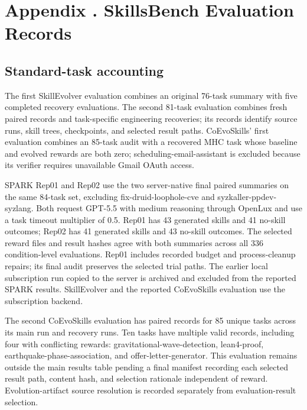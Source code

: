 \section{Appendix \thesection. SkillsBench Evaluation Records}
\label{app:skillsbench-records}
\setcounter{table}{0}
\renewcommand{\thetable}{\thesection\arabic{table}}

\subsection{Standard-task accounting}
The first SkillEvolver evaluation combines an original 76-task summary with five completed recovery evaluations. The second 81-task evaluation combines fresh paired records and task-specific engineering recoveries; its records identify source runs, skill trees, checkpoints, and selected result paths. CoEvoSkills' first evaluation combines an 85-task audit with a recovered MHC task whose baseline and evolved rewards are both zero; scheduling-email-assistant is excluded because its verifier requires unavailable Gmail OAuth access.

SPARK Rep01 and Rep02 use the two server-native final paired summaries on the same 84-task set, excluding fix-druid-loophole-cve and syzkaller-ppdev-syzlang. Both request GPT-5.5 with medium reasoning through OpenLux and use a task timeout multiplier of 0.5. Rep01 has 43 generated skills and 41 no-skill outcomes; Rep02 has 41 generated skills and 43 no-skill outcomes. The selected reward files and result hashes agree with both summaries across all 336 condition-level evaluations. Rep01 includes recorded budget and process-cleanup repairs; its final audit preserves the selected trial paths. The earlier local subscription run copied to the server is archived and excluded from the reported SPARK results. SkillEvolver and the reported CoEvoSkills evaluation use the subscription backend.

The second CoEvoSkills evaluation has paired records for 85 unique tasks across its main run and recovery runs. Ten tasks have multiple valid records, including four with conflicting rewards: gravitational-wave-detection, lean4-proof, earthquake-phase-association, and offer-letter-generator. This evaluation remains outside the main results table pending a final manifest recording each selected result path, content hash, and selection rationale independent of reward. Evolution-artifact source resolution is recorded separately from evaluation-result selection.

